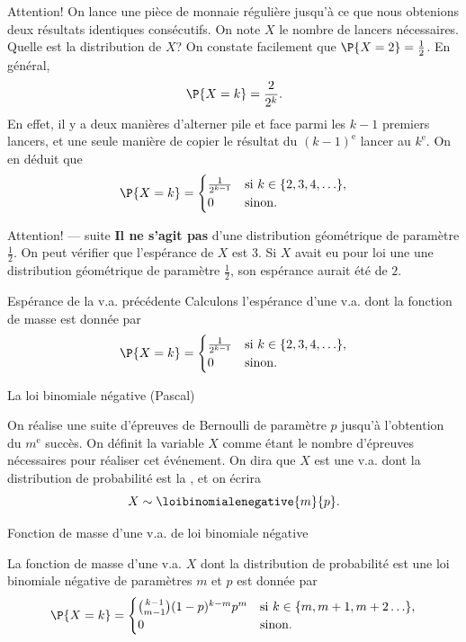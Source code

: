 \documentclass[nuit,charter,pied]{BeamerJS}
\begin{document}
\begin{frame}[t]{Attention!}
	On lance une pièce de monnaie régulière jusqu'à ce que nous obtenions deux résultats identiques consécutifs. On note $X$ le nombre de lancers nécessaires. Quelle est la distribution de $X$?
	\pause
	On constate facilement que $\P{X=2}=\frac{1}{2}$. En général,
	\[\P{X=k}=\frac{2}{2^{k}}.\]
	En effet, il y a deux manières d'alterner pile et face parmi les $k-1$ premiers lancers, et une seule manière de copier le résultat du $(k-1)^{\text{e}}$ lancer au $k^{\text{e}}$. On en déduit que
	\[
	\P{X=k}=\begin{cases} \frac{1}{2^{k-1}} &\text{si}~k\in\{2,3,4,\ldots\},\\
		0 & \text{sinon}
		.\end{cases}
	\]
	\end{frame}
	\begin{frame}[t]{Attention! --- suite}
	\textbf{Il ne s'agit pas} d'une distribution géométrique de paramètre $\frac{1}{2}$. On peut vérifier que l'espérance de $X$ est $3$. Si $X$ avait eu pour loi une une distribution géométrique de paramètre $\frac{1}{2}$, son espérance aurait été de $2$.
\end{frame}
\begin{frame}[t]{Espérance de la v.a. précédente}
Calculons l'espérance d'une v.a. dont la fonction de masse est donnée par
	\[
	\P{X=k}=\begin{cases} \frac{1}{2^{k-1}} &\text{si}~k\in\{2,3,4,\ldots\},\\
		0 & \text{sinon}
		.\end{cases}
	\]
\end{frame}
\begin{frame}{La loi binomiale négative (Pascal)}
	
	\begin{defn}
		On réalise une suite d'épreuves de Bernoulli de paramètre $p$ jusqu'à l'obtention du $m^\text{e}$ succès. On définit la variable $X$ comme étant le nombre d'épreuves nécessaires pour réaliser cet événement. On dira que $X$ est une v.a. dont la distribution de probabilité est la , et on écrira
		\[X\sim \loibinomialenegative{m}{p}.\]
	\end{defn}
	\end{frame}
	\begin{frame}{Fonction de masse d'une v.a. de loi binomiale négative}
	\begin{prop}
		La fonction de masse d'une v.a. $X$ dont la distribution de probabilité est une loi binomiale négative de paramètres $m$ et $p$ est donnée par
		\[
		\P{X=k}=\begin{cases} \binom{k-1}{m-1}(1-p)^{k-m}p^{m} &\text{si}~k\in\{m,m+1,m+2\ldots\},\\
			0 & \text{sinon}
			.\end{cases}
		\]
	\end{prop}
\end{frame}
\end{document}

